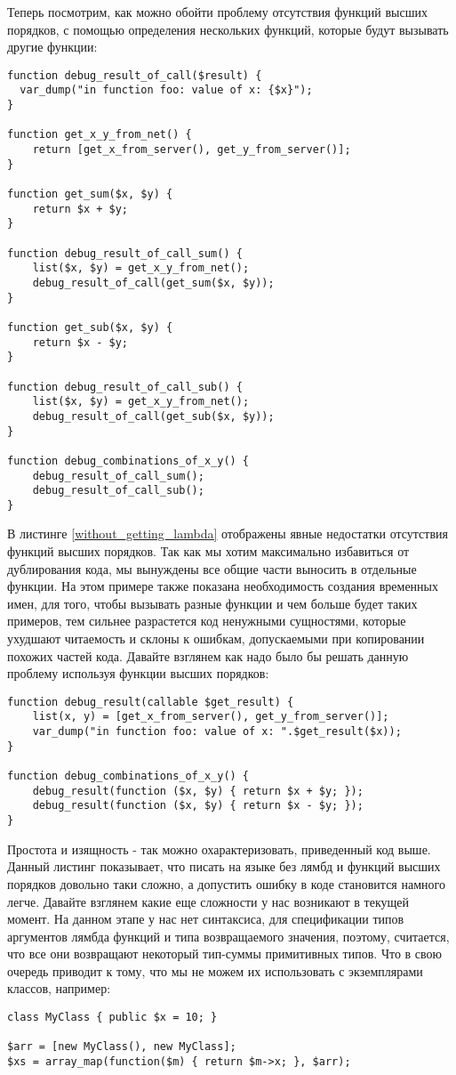 Теперь посмотрим, как можно обойти проблему отсутствия функций высших порядков, с помощью определения нескольких функций, которые будут вызывать другие функции:
\begin{lstlisting}[caption={Пример кода без функций высших порядков},label={without_getting_lambda}]
function debug_result_of_call($result) {
  var_dump("in function foo: value of x: {$x}");
}

function get_x_y_from_net() {
	return [get_x_from_server(), get_y_from_server()];
}

function get_sum($x, $y) {
    return $x + $y;
}

function debug_result_of_call_sum() {
	list($x, $y) = get_x_y_from_net();
	debug_result_of_call(get_sum($x, $y));
}

function get_sub($x, $y) {
    return $x - $y;
}

function debug_result_of_call_sub() {
	list($x, $y) = get_x_y_from_net();
	debug_result_of_call(get_sub($x, $y));
}

function debug_combinations_of_x_y() {
	debug_result_of_call_sum();
	debug_result_of_call_sub();
}
\end{lstlisting}

В листинге \ref{without_getting_lambda} отображены явные недостатки отсутствия функций высших порядков.
Так как мы хотим максимально избавиться от дублирования кода, мы вынуждены все общие части выносить в отдельные функции.
На этом примере также показана необходимость создания временных имен, для того, чтобы вызывать разные функции и чем больше будет таких примеров, тем сильнее разрастется код ненужными сущностями, которые ухудшают читаемость и склоны к ошибкам, допускаемыми при копировании похожих частей кода.
Давайте взглянем как надо было бы решать данную проблему используя функции высших порядков:
\begin{lstlisting}
function debug_result(callable $get_result) {
	list(x, y) = [get_x_from_server(), get_y_from_server()];
	var_dump("in function foo: value of x: ".$get_result($x));
}

function debug_combinations_of_x_y() {
	debug_result(function ($x, $y) { return $x + $y; });
	debug_result(function ($x, $y) { return $x - $y; });
}
\end{lstlisting}

Простота и изящность - так можно охарактеризовать, приведенный код выше.
Данный листинг показывает, что писать на языке без лямбд и функций высших порядков довольно таки сложно, а допустить ошибку в коде становится намного легче.
Давайте взглянем какие еще сложности у нас возникают в текущей момент.
На данном этапе у нас нет синтаксиса, для спецификации типов аргументов лямбда функций и типа возвращаемого значения, поэтому, считается, что все они возвращают некоторый тип-суммы примитивных типов.
Что в свою очередь приводит к тому, что мы не можем их использовать с экземплярами классов, например:
\begin{lstlisting}
class MyClass { public $x = 10; }

$arr = [new MyClass(), new MyClass];
$xs = array_map(function($m) { return $m->x; }, $arr);
\end{lstlisting}

